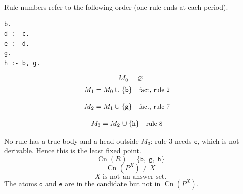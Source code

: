 \documentclass[a4paper,11pt]{article}
\newif\ifexplain
\newcommand{\explain}[1]{\ifexplain\begin{erklbox}#1\end{erklbox}\fi}
\newcommand{\why}[1]{\text{\small #1}}
\newcommand{\at}[1]{\texttt{#1}}
\begin{document}
Rule numbers refer to the following order (one rule ends at each period).
\begin{small}
\begin{verbatim}
b.
d :- c.
e :- d.
g.
h :- b, g.
\end{verbatim}
\end{small}
\explain{Beim Redukt bleibt die Kandidatenmenge fest. Wir entscheiden zuerst, welche Regeln wegfallen. Erst danach berechnen wir aus den verbleibenden positiven Regeln die kleinste abgeschlossene Menge. Ein Modell allein reicht nicht: Diese Menge muss genau der Kandidat sein.}
\[
M_0=\varnothing
\]
\begin{align*}
M_{1} &= M_{0}\cup \{\at{b}\} && \why{fact, rule 2}
\end{align*}
\explain{Diese Regel hat keinen Körper. Ihr Kopf $\at{b}$ ist damit ein Fakt und muss in die Menge.}
\begin{align*}
M_{2} &= M_{1}\cup \{\at{g}\} && \why{fact, rule 7}
\end{align*}
\explain{Diese Regel hat keinen Körper. Ihr Kopf $\at{g}$ ist damit ein Fakt und muss in die Menge.}
\begin{align*}
M_{3} &= M_{2}\cup \{\at{h}\} && \why{rule 8}
\end{align*}
\explain{Für $\at{h}$ brauchen wir $\at{b}$ und $\at{g}$. Weil diese Voraussetzungen bereits hergeleitet sind, dürfen wir den Regelkopf jetzt aufnehmen und alle bisherigen Atome behalten; bei einer fehlenden Voraussetzung würde diese Regel dagegen noch nichts beitragen.}
No rule has a true body and a head outside $M_{3}$: rule 3 needs $\at{c}$, which is not derivable. Hence this is the least fixed point.
\[
\operatorname{Cn}(R)=\{\at{b},\;\at{g},\;\at{h}\}
\]
\[
\operatorname{Cn}(P^X)\ne X
\]
\[
\boxed{X\text{ is not an answer set.}}
\]
The atoms $\at{d}$ and $\at{e}$ are in the candidate but not in $\operatorname{Cn}(P^X)$.
\explain{Warum sterben $\at{d}$ und $\at{e}$? Regel 3 ist gestrichen, weil $\at{e}$ im Kandidaten steht -- also kann $\at{c}$ nirgends herkommen. Ohne $\at{c}$ feuert Regel 4 nie, und ohne $\at{d}$ feuert Regel 5 nie. Die beiden Kandidaten-Atome begründen sich nicht selbst; ein positiver Kreis ohne Startfact bleibt leer.}
\explain{Die Verdicts wurden zusätzlich mit dem Solver geprüft: Nur $\{\at{a},\;\at{f}\}$ ist ein stabiles Modell. Die vollständige Answer-Set-Liste des Programms lautet $\{\at{a},\;\at{f}\}$, $\{\at{a},\;\at{g}\}$ und $\{\at{b},\;\at{c},\;\at{d},\;\at{g},\;\at{h}\}$.}
\end{document}
